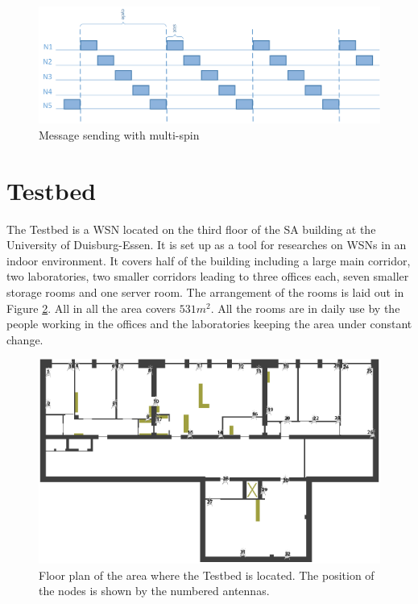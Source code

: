 \begin{figure}[htbp]
	\centering
    \includegraphics[scale=0.8]{content/images/Multispin}
   	\caption{Message sending with multi-spin}
    \label{fig:testbed}
\end{figure}
 
\section{Testbed}
The Testbed is a WSN located on the third floor of the SA building at the University of Duisburg-Essen. It is set up as a tool for researches on WSNs in an indoor environment. It covers half of the building including a large main corridor, two laboratories, two smaller corridors leading to three offices each, seven smaller storage rooms and one server room. The arrangement of the rooms is laid out in Figure \ref{fig:testbed}. All in all the area covers $531m^2$. All the rooms are in daily use by the people working in the offices and the laboratories keeping the area under constant change.

\begin{figure}[htbp]
	\centering
    \includegraphics[scale=0.75]{content/images/Testbed}
   	\caption{Floor plan of the area where the Testbed is located. The position of the nodes is shown by the numbered antennas.}
    \label{fig:testbed}
\end{figure}

